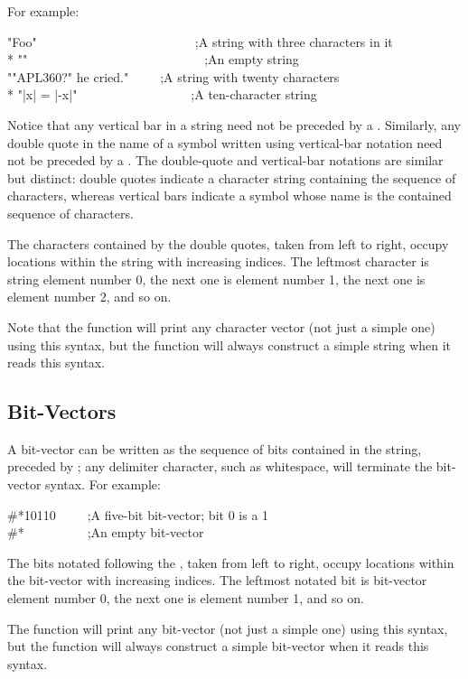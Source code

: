 For example:

\begin{lisp}
"Foo"~~~~~~~~~~~~~~~~~~~~~~~~~;{\rm A string with three characters in it} \\*
""~~~~~~~~~~~~~~~~~~~~~~~~~~~~;{\rm An empty string} \\
"{\Xbackslash}"APL{\Xbackslash}{\Xbackslash}360?{\Xbackslash}" he cried."~~~~~;{\rm A string with twenty characters} \\*
"|x| = |-x|"~~~~~~~~~~~~~~~~~~;{\rm A ten-character string}
\end{lisp}
Notice that any vertical bar \cd{|} in a string need not be
preceded by a \cd{{\Xbackslash}}.  Similarly, any double quote in the name
of a symbol written using vertical-bar notation need not be
preceded by a \cd{{\Xbackslash}}.  The double-quote and vertical-bar notations
are similar but distinct: double quotes indicate a character string
containing the sequence of characters,
whereas vertical bars indicate a symbol whose name is the contained
sequence of characters.

The characters contained by the double quotes, taken from left to right,
occupy locations within the string with increasing indices.
The leftmost character is string element number 0, the next one
is element number 1, the next one is element number 2, and so on.

Note that the function  will print any character vector
(not just a simple one)
using this syntax, but the function  will always construct
a simple string when it reads this syntax.

\subsection{Bit-Vectors}

A bit-vector can be written as the sequence of bits contained in the
string, preceded by \cd{\#*}; any delimiter character, such as whitespace,
will terminate the bit-vector syntax.
For example:
\begin{lisp}
\#*10110~~~~~;{\rm A five-bit bit-vector; bit 0 is a 1} \\
\#*~~~~~~~~~~;{\rm An empty bit-vector}
\end{lisp}
The bits notated following the \cd{\#*}, taken from left to right,
occupy locations within the bit-vector with increasing indices.
The leftmost notated bit is bit-vector element number 0, the next one
is element number 1, and so on.

The function  will print any bit-vector (not just a simple one)
using this syntax, but the function  will always construct
a simple bit-vector when it reads this syntax.


